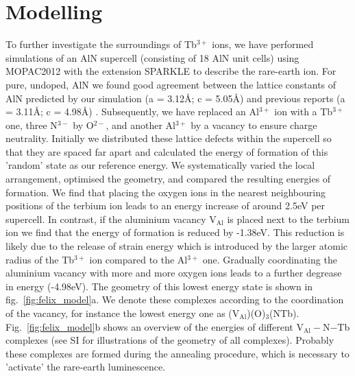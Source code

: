 \documentclass[%
 aip,
rsi,%
 amsmath,amssymb,
 reprint,%
]{revtex4-1}
\begin{document}
\section{Modelling}
\label{sec:model}
To further investigate the surroundings of Tb$^{3+}$ ions, we have performed simulations of an AlN supercell (consisting of 18 AlN unit cells) using MOPAC2012 \cite{steward12} with the extension SPARKLE \cite{freire10} to describe the rare-earth ion. For pure, undoped, AlN we found good agreement between the lattice constants of AlN predicted by our simulation (a = 3.12\AA; c = 5.05\AA) and previous reports (a = 3.11\AA; c = 4.98\AA) \cite{ICDD11}. Subsequently, we have replaced an Al$^{3+}$ ion with a Tb$^{3+}$ one, three N$^{3-}$ by O$^{2-}$, and another Al$^{3+}$ by a vacancy to ensure charge neutrality. Initially we distributed these lattice defects within the supercell so that they are spaced far apart and calculated the energy of formation of this 'random' state as our reference energy. We systematically varied the local arrangement, optimised the geometry, and compared the resulting energies of formation. We find that placing the oxygen ions in the nearest neighbouring positions of the terbium ion leads to an energy increase of around 2.5eV per supercell. In contrast, if the aluminium vacancy V$_\text{Al}$ is placed next to the terbium ion we find that the energy of formation is reduced by -1.38eV. This reduction is likely due to the release of strain energy which is introduced by the larger atomic radius of the Tb$^{3+}$ ion compared to the Al$^{3+}$ one. Gradually coordinating the aluminium vacancy with more and more oxygen ions leads to a further degrease in energy (-4.98eV). The geometry of this lowest energy state is shown in fig.~\ref{fig:felix_model}a. We denote these complexes according to the coordination of the vacancy, for instance the lowest energy one as (V$_\text{Al}$)(O)$_3$(NTb). Fig.~\ref{fig:felix_model}b shows an overview of the energies of different V$_\text{Al}-$N$-$Tb complexes (see SI for illustrations of the geometry of all complexes). Probably these complexes are formed during the annealing procedure, which is necessary to 'activate' the rare-earth luminescence.
\end{document}
